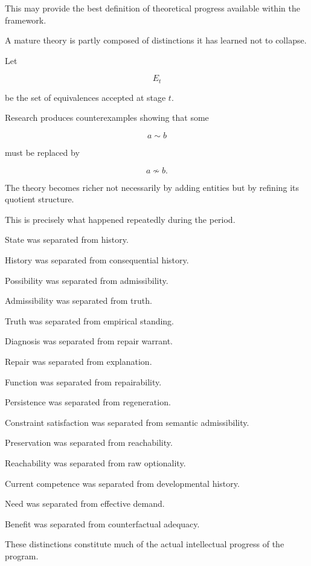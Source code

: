 \documentclass[11pt]{article}
\theoremstyle{remark}
\begin{document}
This may provide the best definition of theoretical progress available within the framework.

A mature theory is partly composed of distinctions it has learned not to collapse.

Let

\begin{equation}
E_t
\end{equation}

be the set of equivalences accepted at stage $t$.

Research produces counterexamples showing that some

\begin{equation}
a\sim b
\end{equation}

must be replaced by

\begin{equation}
a\not\sim b.
\end{equation}

The theory becomes richer not necessarily by adding entities but by refining its quotient structure.

This is precisely what happened repeatedly during the period.

State was separated from history.

History was separated from consequential history.

Possibility was separated from admissibility.

Admissibility was separated from truth.

Truth was separated from empirical standing.

Diagnosis was separated from repair warrant.

Repair was separated from explanation.

Function was separated from repairability.

Persistence was separated from regeneration.

Constraint satisfaction was separated from semantic admissibility.

Preservation was separated from reachability.

Reachability was separated from raw optionality.

Current competence was separated from developmental history.

Need was separated from effective demand.

Benefit was separated from counterfactual adequacy.

These distinctions constitute much of the actual intellectual progress of the program.
\end{document}
